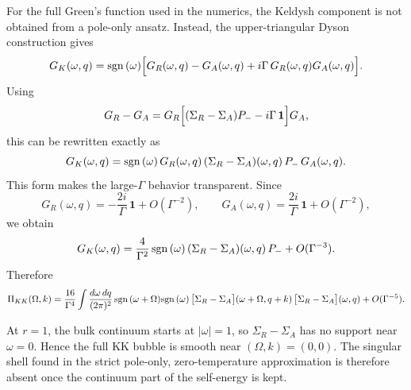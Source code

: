\documentclass[aps,prx,preprint,amsmath,amssymb]{revtex4-2}
\newcommand{\sgn}{{\rm sgn\,}}
\begin{document}
For the full Green's function used in the numerics, the Keldysh component is not
obtained from a pole-only ansatz.  Instead, the upper-triangular Dyson
construction gives
\begin{equation}\label{eq:GK-dyson-appendix}
G_K(\omega,q)
=
\sgn(\omega)\Bigl[
G_R(\omega,q)-G_A(\omega,q)+i\Gamma\,G_R(\omega,q)G_A(\omega,q)
\Bigr].
\end{equation}
Using
\begin{equation}
G_R-G_A
=
G_R\Bigl[(\Sigma_R-\Sigma_A)P_- - i\Gamma\,\mathbf{1}\Bigr]G_A,
\end{equation}
this can be rewritten exactly as
\begin{equation}\label{eq:GK-spectral-appendix}
G_K(\omega,q)
=
\sgn(\omega)\,G_R(\omega,q)\,(\Sigma_R-\Sigma_A)(\omega,q)\,P_-\,G_A(\omega,q).
\end{equation}
This form makes the large-\(\Gamma\) behavior transparent.  Since
\begin{equation}
G_R(\omega,q)= -\frac{2i}{\Gamma}\,\mathbf{1}+O(\Gamma^{-2}),
\qquad
G_A(\omega,q)= \frac{2i}{\Gamma}\,\mathbf{1}+O(\Gamma^{-2}),
\end{equation}
we obtain
\begin{equation}\label{eq:GK-largeGamma-appendix}
G_K(\omega,q)
=
\frac{4}{\Gamma^2}\,\sgn(\omega)\,(\Sigma_R-\Sigma_A)(\omega,q)\,P_-
+O(\Gamma^{-3}).
\end{equation}
Therefore
\begin{equation}\label{eq:PiKK-largeGamma-appendix}
\Pi_{KK}(\Omega,k)
=
\frac{16}{\Gamma^4}
\int\frac{d\omega\,dq}{(2\pi)^2}\,
\sgn(\omega+\Omega)\sgn(\omega)\,
\bigl[\Sigma_R-\Sigma_A\bigr](\omega+\Omega,q+k)\,
\bigl[\Sigma_R-\Sigma_A\bigr](\omega,q)
+O(\Gamma^{-5}).
\end{equation}

At \(r=1\), the bulk continuum starts at \(|\omega|=1\), so
\(\Sigma_R-\Sigma_A\) has no support near \(\omega=0\).  Hence the full KK
bubble is smooth near \((\Omega,k)=(0,0)\).  The singular shell found in the
strict pole-only, zero-temperature approximation is therefore absent once the
continuum part of the self-energy is kept.
\end{document}
